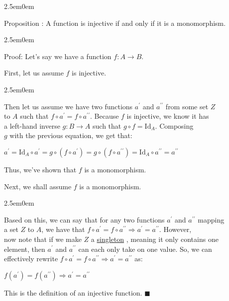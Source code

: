 \documentclass{book}
\newcommand{\hTwo}{%
   \color{MidnightBlue}%
   \fontsize{13}{15}\selectfont%
}
\newcommand{\hThree}{%
   \color{PineGreen!85!Orange}
   \fontsize{13}{15}\selectfont%
}
\newenvironment{myIndent}{%
   \begin{adjustwidth}{2.5em}{0em}%
}{%
   \end{adjustwidth}%
}
\newcommand{\udefine}[1]{{%
   \setulcolor{Red}%
   \setul{0.14em}{0.07em}%
   \ul{#1}%
}}
\newcommand{\pprime}{{\prime\prime}}
\newcommand{\myId}{\mathrm{Id}}
\newcounter{PropNumber}
\newcommand{\propCount}{%
   \stepcounter{PropNumber}%
   \thePropNumber%
}
\newcommand{\retTwo}{\hfill\bigbreak}
\begin{document}
   \begin{myIndent}
      \hTwo
      Proposition \propCount: A function is injective if and only if
      it is a monomorphism.

      \begin{myIndent}
         \hThree
         Proof: Let's say we have a function $f: A \rightarrow B$.\retTwo

         First, let us assume $f$ is injective.
         
         \begin{myIndent}
            Then let us assume we have two functions $a^{\prime}$ 
            and $a^{\pprime}$ from some set $Z$\\ to $A$ such that 
            $f \circ a^{\prime} = f \circ a^{\pprime}$. Because $f$ is injective, we know it has\\ a left-hand inverse
            $g: B \rightarrow A$ such that $g \circ f = \myId_A$.
            Composing\\ $g$ with the previous equation, we get that:

            {\center $a^{\prime} = \mathrm{Id}_A \circ a^{\prime} = g\circ(f \circ a^{\prime}) = g \circ (f \circ 
            a^{\pprime}) = \mathrm{Id}_A \circ a^{\pprime} = a^{\pprime}$\retTwo\par}

            Thus, we've shown that $f$ is a monomorphism.
         \end{myIndent}
         \newpage

         Next, we shall assume $f$ is a monomorphism.

         \begin{myIndent}
            Based on this, we can say that for any two functions 
            $a^{\prime}$ and $a^{\pprime}$ mapping\\ a set
            $Z$ to $A$, we have that $f \circ a^{\prime}
            = f \circ a^{\pprime} \Longrightarrow a^{\prime} = 
            a^{\pprime}$. However,\\ now note that if we make $Z$ a 
            \udefine{singleton}, meaning it only contains one\\ element, 
            then $a^{\prime}$ and $a^{\pprime}$ can each
            only take on one value. So, we can\\ effectively rewrite
            $f \circ a^{\prime} = f \circ a^{\pprime}
            \Rightarrow a^{\prime} = a^{\pprime}$ as:

            {\center $f(a^{\prime}) = f(a^{\pprime}) \Rightarrow 
            a^{\prime} = a^{\pprime}$\retTwo\par}

            This is the definition of an injective function. $\blacksquare$\retTwo
         \end{myIndent}
      \end{myIndent}
   \end{myIndent}
\end{document}
